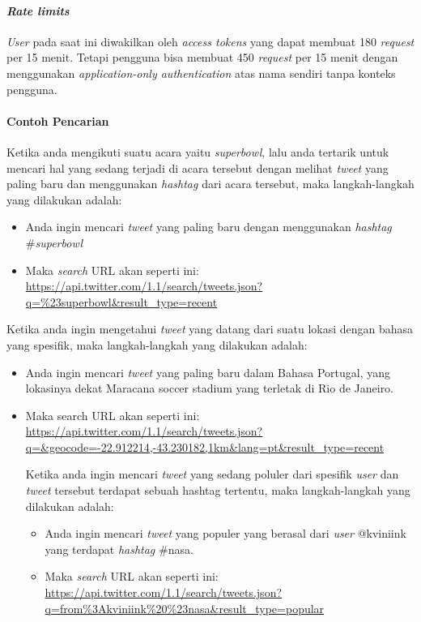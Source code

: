 \paragraph{\textit{Rate limits}}
\textit{User} pada saat ini diwakilkan oleh \textit{access tokens} yang dapat membuat 180 \textit{request} per 15 menit. Tetapi pengguna bisa membuat 450 \textit{request} per 15 menit dengan menggunakan \textit{application-only authentication} atas nama sendiri tanpa konteks pengguna.

\paragraph{Contoh Pencarian}
Ketika anda mengikuti suatu acara yaitu \textit{superbowl}, lalu anda tertarik untuk mencari hal yang sedang terjadi di acara tersebut dengan melihat \textit{tweet} yang paling baru dan menggunakan \textit{hashtag} dari acara tersebut, maka langkah-langkah yang dilakukan adalah:
\begin{itemize}
	\item Anda ingin mencari \textit{tweet} yang paling baru dengan menggunakan \textit{hashtag} \#\textit{superbowl}
	\item Maka \textit{search} URL akan seperti ini:
	\url{https://api.twitter.com/1.1/search/tweets.json?q=\%23superbowl\&result\_type=recent}
\end{itemize}

Ketika anda ingin mengetahui \textit{tweet} yang datang dari suatu lokasi dengan bahasa yang spesifik, maka langkah-langkah yang dilakukan adalah:
\begin{itemize}
	\item Anda ingin mencari \textit{tweet} yang paling baru dalam Bahasa Portugal, yang lokasinya dekat Maracana soccer stadium yang terletak di Rio de Janeiro.
	\item Maka search URL akan seperti ini:
	\url{https://api.twitter.com/1.1/search/tweets.json?q=\&geocode=-22.912214,-43.230182,1km\&lang=pt\&result\_type=recent}
	
Ketika anda ingin mencari \textit{tweet} yang sedang poluler dari spesifik \textit{user} dan \textit{tweet} tersebut terdapat sebuah hashtag tertentu, maka langkah-langkah yang dilakukan adalah:
\begin{itemize}
	\item Anda ingin mencari \textit{tweet} yang populer yang berasal dari \textit{user} @kviniink yang terdapat \textit{hashtag} \#nasa.
	\item Maka \textit{search} URL akan seperti ini:
	\url{https://api.twitter.com/1.1/search/tweets.json?q=from\%3Akviniink\%20\%23nasa\&result\_type=popular}
\end{itemize}
\end{itemize}

